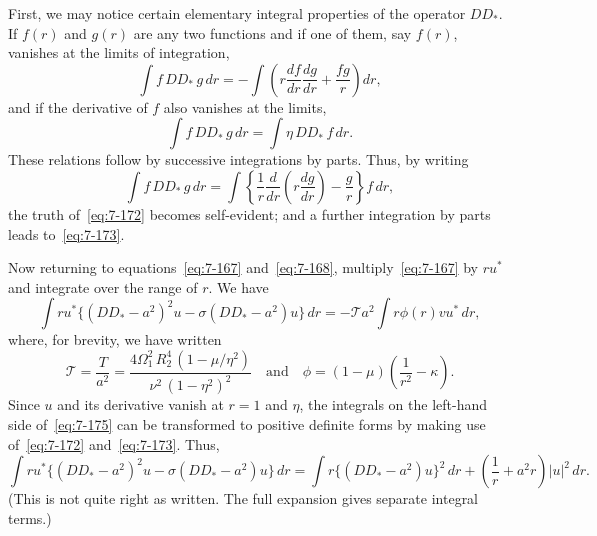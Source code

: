 First, we may notice certain elementary integral properties of the
operator $DD_*$.  If $f(r)$ and $g(r)$ are any two functions and if one of them,
say $f(r)$, vanishes at the limits of integration,
\begin{equation}
\label{eq:7-172}
\int f\, DD_*\, g\, dr
= -\int\!\left(r\frac{df}{dr}\frac{dg}{dr}+\frac{fg}{r}\right)dr,
\end{equation}
and if the derivative of $f$ also vanishes at the limits,
\begin{equation}
\label{eq:7-173}
\int f\, DD_*\, g\, dr = \int \eta\, DD_*\, f\, dr.
\end{equation}
These relations follow by successive integrations by parts.  Thus, by
writing
\begin{equation}
\label{eq:7-174}
\int f\, DD_*\, g\, dr
= \int\!\left\{
\frac{1}{r}\frac{d}{dr}\!\left(r\frac{dg}{dr}\right)
- \frac{g}{r}\right\} f\, dr,
\end{equation}
the truth of~\eqref{eq:7-172} becomes self-evident; and a further integration by parts
leads to~\eqref{eq:7-173}.

Now returning to equations~\eqref{eq:7-167} and~\eqref{eq:7-168}, multiply~\eqref{eq:7-167} by $ru^*$
and integrate over the range of $r$.  We have
\begin{equation}
\label{eq:7-175}
\int ru^*\{(DD_*-a^2)^2u - \sigma(DD_*-a^2)u\}\,dr
= -\mathscr{T}a^2 \int r\phi(r)vu^*\,dr,
\end{equation}
where, for brevity, we have written
\begin{equation}
\label{eq:7-176}
\mathscr{T} = \frac{T}{a^2} = \frac{4\Omega_1^2\,R_2^4\,(1-\mu/\eta^2)}{\nu^2\,(1-\eta^2)^2}
\quad \text{and} \quad
\phi = (1-\mu)\!\left(\frac{1}{r^2}-\kappa\right).
\end{equation}
Since $u$ and its derivative vanish at $r = 1$ and $\eta$, the integrals on the
left-hand side of~\eqref{eq:7-175} can be transformed to positive definite forms by
making use of~\eqref{eq:7-172} and~\eqref{eq:7-173}.  Thus,
\begin{equation}
\label{eq:7-177}
\int ru^*\{(DD_*-a^2)^2u - \sigma(DD_*-a^2)u\}\,dr
= \int r\{(DD_*-a^2)u\}^2\,dr
+ \left(\frac{1}{r}+a^2 r\right)|u|^2\,dr.
\end{equation}
(This is not quite right as written. The full expansion gives separate integral terms.)

